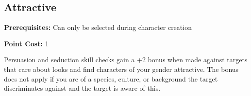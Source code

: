 \subsection*{Attractive}\label{feat:attractive}

\noindent
\textbf{Prerequisites:} Can only be selected during character creation

\noindent
\textbf{Point Cost:} 1 

Persuasion and seduction skill checks gain a +2 bonus when made against
targets that care about looks and find characters of your gender attractive.
The bonus does not apply if you are of a species, culture, or background the
target discriminates against and the target is aware of this.
